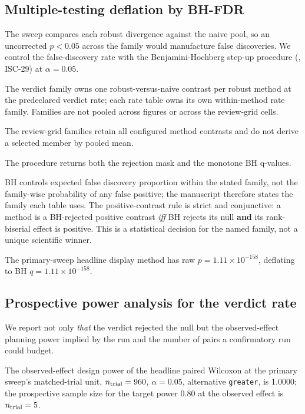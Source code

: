 \documentclass[
  english,
]{article}
\theoremstyle{plain}
\theoremstyle{definition}
\theoremstyle{remark}
\theoremstyle{definition}
\begin{document}
\subsection{Multiple-testing deflation by BH-FDR}\label{sec:methods-fdr}

The sweep compares each robust divergence against the naive pool, so an
uncorrected \(p < 0.05\) across the family would manufacture false
discoveries. We control the false-discovery rate with the
Benjamini-Hochberg step-up procedure \citep{benjamini1995controlling}
(, ISC-29) at \(\alpha = 0.05\).

The verdict family owns one robust-versus-naive contrast per robust
method at the predeclared verdict rate; each rate table owns its own
within-method rate family. Families are not pooled across figures or
across the review-grid cells.

The review-grid families retain all configured method contrasts and do
not derive a selected member by pooled mean.

The procedure returns both the rejection mask and the monotone BH
q-values.

BH controls expected false discovery proportion within the stated
family, not the family-wise probability of any false positive; the
manuscript therefore states the family each table uses. The
positive-contrast rule is strict and conjunctive: a method is a
BH-rejected positive contrast \emph{iff} BH rejects its null
\textbf{and} its rank-biserial effect is positive. This is a statistical
decision for the named family, not a unique scientific winner.

The primary-sweep headline display method has raw
\(p = 1.11 \times 10^{-158}\), deflating to BH
\(q = 1.11 \times 10^{-158}\).

\subsection{Prospective power analysis for the verdict
rate}\label{sec:methods-statistics-power}

We report not only \emph{that} the verdict rejected the null but the
observed-effect planning power implied by the run and the number of
pairs a confirmatory run could budget.

The observed-effect design power of the headline paired Wilcoxon at the
primary sweep's matched-trial unit, \(n_{\rm trial} = 960\),
\(\alpha = 0.05\), alternative \texttt{greater}, is 1.0000; the
prospective sample size for the target power 0.80 at the observed effect
is \(n_{\rm trial} = 5\).
\end{document}

